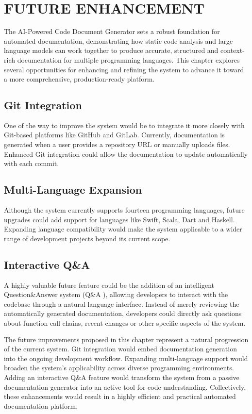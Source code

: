 \chapter{FUTURE ENHANCEMENT}

\hspace{0.5cm} The AI-Powered Code Document Generator sets a robust foundation for automated documentation, demonstrating how static code analysis and large language models can work together to produce accurate, structured and context-rich documentation for multiple programming languages. This chapter explores several opportunities for enhancing and refining the system to advance it toward a more comprehensive, production-ready platform.

\section{Git Integration}
\hspace{0.5cm} One of the way to improve the system would be to integrate it more closely with Git-based platforms like GitHub and GitLab. Currently, documentation is generated when a user provides a repository URL or manually uploads files. Enhanced Git integration could allow the documentation to update automatically with each commit.



\section{Multi-Language Expansion}
\hspace{0.5cm} Although the system currently supports fourteen programming languages, future upgrades could add support for languages like Swift, Scala, Dart and Haskell. Expanding language compatibility would make the system applicable to a wider range of development projects beyond its current scope.


\section{Interactive Q\&A}
\hspace{0.5cm} A highly valuable future feature could be the addition of an intelligent Question\&Answer system (Q\&A ), allowing developers to interact with the codebase through a natural language interface. Instead of merely reviewing the automatically generated documentation, developers could directly ask questions about function call chains, recent changes or other specific aspects of the system.



\hspace{0.5cm}The future improvements proposed in this chapter represent a natural progression of the current system. Git integration would embed documentation generation into the ongoing development workflow. Expanding multi-language support would broaden the system’s applicability across diverse programming environments. Adding an interactive Q\&A feature would transform the system from a passive documentation generator into an active tool for code understanding. Collectively, these enhancements would result in a highly efficient and practical automated documentation platform.